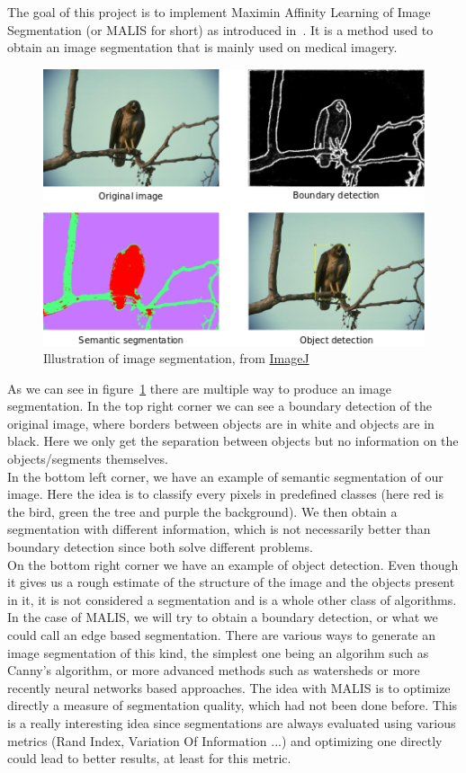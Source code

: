 The goal of this project is to implement Maximin Affinity Learning of Image
Segmentation (or MALIS for short) as introduced in~\cite{turaga_maximin_2009}.
It is a method used to obtain an image segmentation that is mainly used on medical
imagery.\\

\begin{figure}[!htbp]
	\centering
	\includegraphics[width=0.7\linewidth]{./images/segmentation.png}
	\caption{Illustration of image segmentation, from
	\href{imagej.net/File:TWS-application-examples.png}{ImageJ}}%
	\label{fig:segmentation}
\end{figure}

As we can see in figure~\ref{fig:segmentation} there are multiple way to
produce an image segmentation. In the top right corner we can see a boundary
detection of the original image, where borders between objects are in white and
objects are in black. Here we only get the separation between objects but no
information on the objects/segments themselves.\\
In the bottom left corner, we have an example of semantic segmentation of our
image. Here the idea is to classify every pixels in predefined classes (here
red is the bird, green the tree and purple the background). We then obtain a
segmentation with different information, which is not necessarily better than
boundary detection since both solve different problems.\\
On the bottom right corner we have an example of object detection. Even though
it gives us a rough estimate of the structure of the image and the objects
present in it, it is not considered  a segmentation and is a whole other class
of algorithms.\\

In the case of MALIS, we will try to obtain a boundary detection, or what we
could call an edge based segmentation. There are various ways to generate an
image segmentation of this kind, the simplest one being an algorihm such as
Canny's algorithm, or more advanced methods such as watersheds or more recently
neural networks based approaches. The idea with MALIS is to optimize directly a
measure of segmentation quality, which had not been done before. This is a
really interesting idea since segmentations are always evaluated using various
metrics (Rand Index, Variation Of Information ...) and optimizing one directly
could lead to better results, at least for this metric.\\

